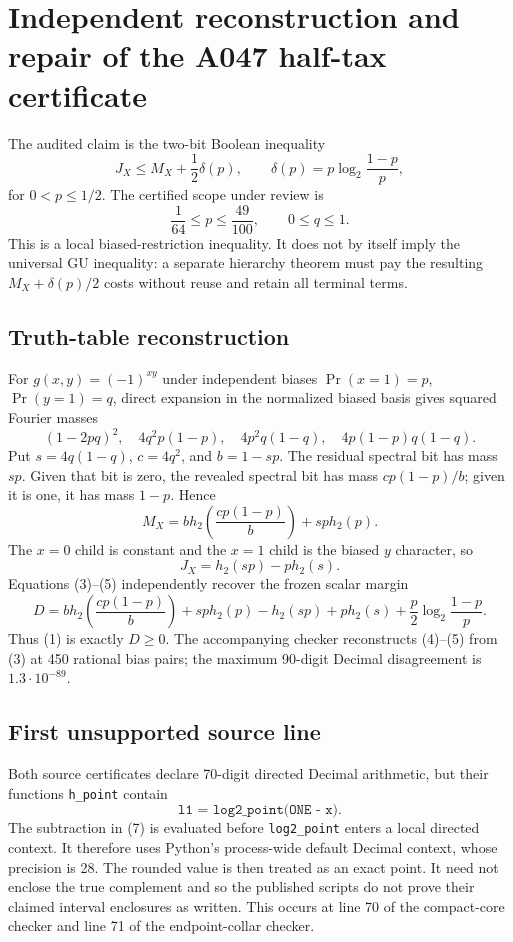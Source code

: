 \section*{Independent reconstruction and repair of the A047 half-tax certificate}

The audited claim is the two-bit Boolean inequality
\[
 J_X\le M_X+\frac12\delta(p),\qquad
 \delta(p)=p\log_2\frac{1-p}{p},                       \tag{1}
\]
for $0<p\le 1/2$.  The certified scope under review is
\[
 \frac1{64}\le p\le\frac{49}{100},\qquad 0\le q\le1. \tag{2}
\]
This is a local biased-restriction inequality.  It does not by itself imply
the universal GU inequality: a separate hierarchy theorem must pay the
resulting $M_X+\delta(p)/2$ costs without reuse and retain all terminal terms.

\subsection*{Truth-table reconstruction}

For $g(x,y)=(-1)^{xy}$ under independent biases
$\Pr(x=1)=p$, $\Pr(y=1)=q$, direct expansion in the normalized biased basis
gives squared Fourier masses
\[
 (1-2pq)^2,\quad 4q^2p(1-p),\quad
 4p^2q(1-q),\quad4p(1-p)q(1-q).                       \tag{3}
\]
Put $s=4q(1-q)$, $c=4q^2$, and $b=1-sp$.  The residual spectral bit has
mass $sp$.  Given that bit is zero, the revealed spectral bit has mass
$cp(1-p)/b$; given it is one, it has mass $1-p$.  Hence
\[
 M_X=b h_2\!\left(\frac{cp(1-p)}b\right)+sp h_2(p).   \tag{4}
\]
The $x=0$ child is constant and the $x=1$ child is the biased $y$ character,
so
\[
 J_X=h_2(sp)-p h_2(s).                                \tag{5}
\]
Equations (3)--(5) independently recover the frozen scalar margin
\[
 D=b h_2\!\left(\frac{cp(1-p)}b\right)+sp h_2(p)
   -h_2(sp)+p h_2(s)+\frac p2\log_2\frac{1-p}{p}.     \tag{6}
\]
Thus (1) is exactly $D\ge0$.  The accompanying checker reconstructs
(4)--(5) from (3) at 450 rational bias pairs; the maximum 90-digit Decimal
disagreement is $1.3\cdot10^{-89}$.

\subsection*{First unsupported source line}

Both source certificates declare 70-digit directed Decimal arithmetic, but
their functions \texttt{h\_point} contain
\[
 \texttt{l1 = log2\_point(ONE - x)}.                  \tag{7}
\]
The subtraction in (7) is evaluated before \texttt{log2\_point} enters a
local directed context.  It therefore uses Python's process-wide default
Decimal context, whose precision is 28.  The rounded value is then treated
as an exact point.  It need not enclose the true complement and so the
published scripts do not prove their claimed interval enclosures as written.
This occurs at line 70 of the compact-core checker and line 71 of the
endpoint-collar checker.

